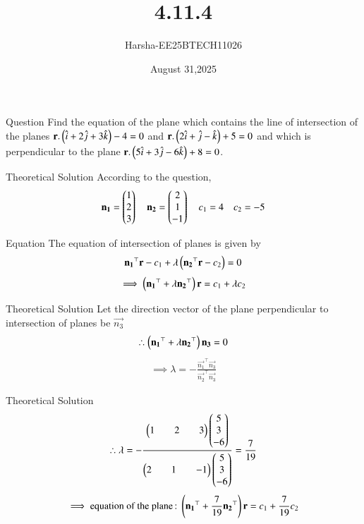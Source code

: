 \documentclass{beamer}
\title %
{4.11.4}
\date{August 31,2025}
\author %
{Harsha-EE25BTECH11026}
\begin{document}
\frame{\titlepage}


\begin{frame}{Question}
Find the equation of the plane which contains the line of intersection of the planes $\mathbf{r}.\left(\hat{i}+2\hat{j}+3\hat{k}\right)-4=0$ and $\mathbf{r}.\left(2\hat{i}+\hat{j}-\hat{k}\right)+5=0$ and which is perpendicular to the plane $\mathbf{r}.\left(5\hat{i}+3\hat{j}-6\hat{k}\right)+8=0$.
\end{frame}

\begin{frame}{Theoretical Solution}
According to the question,\\
\begin{align}
    \mathbf{n_1}=\begin{pmatrix}1\\2\\3\end{pmatrix} \quad \mathbf{n_2}=\begin{pmatrix}2\\1\\-1\end{pmatrix} \quad c_1=4 \quad c_2=-5
\end{align}
\end{frame}

\begin{frame}{Equation}
The equation of intersection of planes is given by
\begin{align}
    \mathbf{n_1}^{\top}\mathbf{r}-c_1+\lambda\left(\mathbf{n_2}^{\top}\mathbf{r}-c_2\right)=0
\end{align}
\begin{align}
    \implies \left(\mathbf{n_1}^{\top}+\lambda\mathbf{n_2}^{\top}\right)\mathbf{r}=c_1+\lambda c_2
\end{align}
\end{frame}

\begin{frame}{Theoretical Solution}
Let the direction vector of the plane perpendicular to intersection of planes be $\vec{n_3}$
\begin{align}
    \therefore \left(\mathbf{n_1}^{\top}+\lambda\mathbf{n_2}^{\top}\right)\mathbf{n_3}=0
\end{align}
\begin{align}
    \implies \lambda=-\frac{\vec{n_1}^{\top}\vec{n_3}}{\vec{n_2}^{\top}\vec{n_3}}
\end{align}
\end{frame}
\begin{frame}{Theoretical Solution}
\begin{align}
    \therefore \lambda=-\frac{\begin{pmatrix}1&&2&&3\end{pmatrix}\begin{pmatrix}5\\3\\-6\end{pmatrix}}{\begin{pmatrix}2&&1&&-1\end{pmatrix}\begin{pmatrix}5\\3\\-6\end{pmatrix}}=\frac{7}{19}
\end{align}
\begin{align}
    \implies \text{equation of the plane\,:\;} \left(\mathbf{n_1}^{\top}+\frac{7}{19}\mathbf{n_2}^{\top}\right)\mathbf{r}=c_1+\frac{7}{19}c_2 
\end{align}
\end{frame}
\end{document}
